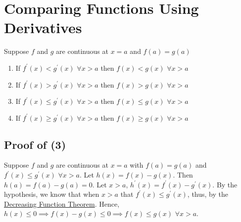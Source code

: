 \documentclass[oneside]{book}
\newcommand\tab[1][1cm]{\hspace*{#1}}
\newcommand\nextline{\newline\tab}
\begin{document}
\section{Comparing Functions Using Derivatives}
Suppose $f$ and $g$ are continuous at $x=a$ and $f(a)=g(a)$
\begin{enumerate}
\item If $f^\prime(x) < g^\prime(x)$ $\forall x>a$ then $f(x)<g(x)$ $\forall x>a$
\item If $f^\prime(x) > g^\prime(x)$ $\forall x>a$ then $f(x)>g(x)$ $\forall x>a$
\item If $f^\prime(x) \leq g^\prime(x)$ $\forall x>a$ then $f(x)\leq g(x)$ $\forall x>a$
\item If $f^\prime(x) \geq g^\prime(x)$ $\forall x>a$ then $f(x)\geq g(x)$ $\forall x>a$
\end{enumerate}
\subsection{Proof of (3)}
\tab
Suppose $f$ and $g$ are continuous at $x=a$ with $f(a)=g(a)$ and $f^\prime(x) \leq g^\prime(x)$ $\forall x>a$.
\nextline
Let $h(x)=f(x)-g(x)$. Then $h(a)=f(a)-g(a)=0$. Let $x>a$, $h^\prime(x)=f^\prime(x)-g^\prime(x)$. By the hypothesis, we know that when $x>a$ that $f^\prime(x)\leq g^\prime(x)$, thus, by the \hyperref[sec:IncFT]{Decreasing Function Theorem}. Hence, $h(x)\leq 0\implies f(x)-g(x)\leq 0\implies f(x)\leq g(x)$ $\forall x>a$.
\end{document}
